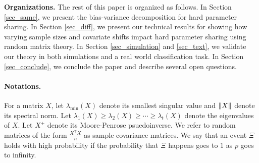 \smallskip
\noindent\textbf{Organizations.}
The rest of this paper is organized as follows.
In Section \ref{sec_same}, we present the bias-variance decomposition for hard parameter sharing.
In Section \ref{sec_diff}, we present our technical results for showing how varying sample sizes and covariate shifts impact hard parameter sharing using random matrix theory.
In Section \ref{sec_simulation} and \ref{sec_text}, we validate our theory in both simulations and a real world classification task.
In Section \ref{sec_conclude}, we conclude the paper and describe several open questions.

\paragraph{Notations.}
For a matrix $X$, let $\lambda_{\min}(X)$ denote its smallest singular value and $\|X\|$ denote its spectral norm.
Let $\lambda_1(X) \ge \lambda_2(X) \ge \cdots \ge \lambda_t(X)$ denote the eigenvalues of $X$.
Let $X^+$ denote its Moore-Penrose psuedoinverse.
We refer to random matrices of the form $\frac {X^\top X} n$ as sample covariance matrices.
We say that an event $\Xi$ holds with high probability if the probability that $\Xi$ happens goes to $1$ as $p$ goes to infinity.
